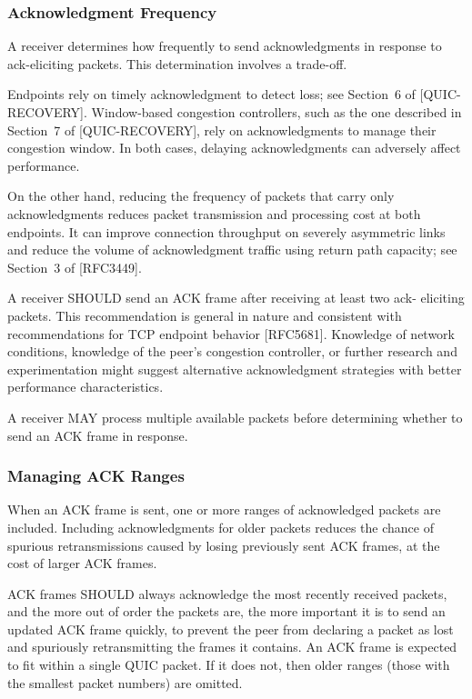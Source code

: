 \documentclass{article}
\begin{document}
\subsubsection{Acknowledgment Frequency}

A receiver determines how frequently to send acknowledgments in response to ack-eliciting packets.  This determination involves a trade-off.

Endpoints rely on timely acknowledgment to detect loss; see Section~6 of [QUIC-RECOVERY].  Window-based congestion controllers, such as the one described in Section~7 of [QUIC-RECOVERY], rely on acknowledgments to manage their congestion window.  In both cases, delaying acknowledgments can adversely affect performance.

On the other hand, reducing the frequency of packets that carry only acknowledgments reduces packet transmission and processing cost at both endpoints.  It can improve connection throughput on severely asymmetric links and reduce the volume of acknowledgment traffic using return path capacity; see Section~3 of [RFC3449].

A receiver SHOULD send an ACK frame after receiving at least two ack- eliciting packets.  This recommendation is general in nature and consistent with recommendations for TCP endpoint behavior [RFC5681]. Knowledge of network conditions, knowledge of the peer's congestion controller, or further research and experimentation might suggest alternative acknowledgment strategies with better performance characteristics.

A receiver MAY process multiple available packets before determining whether to send an ACK frame in response.

\subsubsection{Managing ACK Ranges}

When an ACK frame is sent, one or more ranges of acknowledged packets are included.  Including acknowledgments for older packets reduces the chance of spurious retransmissions caused by losing previously sent ACK frames, at the cost of larger ACK frames.

ACK frames SHOULD always acknowledge the most recently received packets, and the more out of order the packets are, the more important it is to send an updated ACK frame quickly, to prevent the peer from declaring a packet as lost and spuriously retransmitting the frames it contains.  An ACK frame is expected to fit within a single QUIC packet.  If it does not, then older ranges (those with the smallest packet numbers) are omitted.
\end{document}

